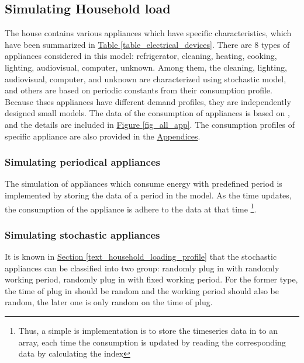 \documentclass[12pt,a4paper]{report}
\begin{document}
                \subsection{Simulating Household load}
                \label{text_simulatinghouseholdload}
                The house contains various appliances which have specific characteristics, which have been summarized in \hyperref[table_electrical_devices]{Table \ref*{table_electrical_devices}}. There are 8 types of appliances considered in this model: refrigerator, cleaning, heating, cooking, lighting, audiovisual, computer, unknown. Among them, the cleaning, lighting, audiovisual, computer, and unknown are characterized using stochastic model, and others are based on periodic constants from their consumption profile.
                Because thses appliances have different demand profiles, they are independently designed small models.
                The data of the consumption of appliances is based on \cite{report:household}, and the details are included in \hyperref[fig_all_app]{Figure \ref*{fig_all_app}}. The consumption profiles of specific appliance are also provided in the \hyperref[text_appendices]{Appendices}.

                \subsubsection{Simulating periodical appliances}
                The simulation of appliances which consume energy with predefined period is implemented by storing the data of a period in the model. As the time updates, the consumption of the appliance is adhere to the data at that time \footnote{Thus, a simple is implementation is to store the timeseries data in to an array, each time the consumption is updated by reading the corresponding data by calculating the index}. 
                \subsubsection{Simulating stochastic appliances}
                It is known in \hyperref[text_household_loading_profile]{Section \ref*{text_household_loading_profile}} that the stochastic appliances can be classified into two group: randomly plug in with randomly working period, randomly plug in with fixed working period. For the former type, the time of plug in should be random and the working period should also be random, the later one is only random on the time of plug. 
\end{document}
